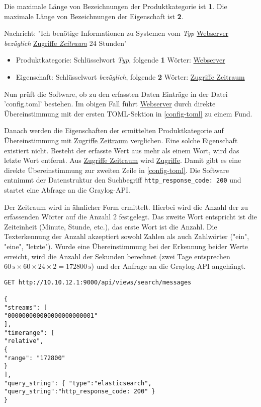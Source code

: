 Die maximale Länge von Bezeichnungen der Produktkategorie ist \textbf{1}. Die maximale Länge von Bezeichnungen der Eigenschaft ist \textbf{2}.

Nachricht: "Ich benötige Informationen zu Systemen vom \textit{Typ} \uline{Webserver} \textit{bezüglich} \uline{Zugriffe \textit{Zeitraum}} 24 Stunden"

\begin{itemize}
\item Produktkategorie: Schlüsselwort \textit{Typ}, folgende \textbf{1} Wörter: \uline{Webserver}
\item Eigenschaft: Schlüsselwort \textit{bezüglich}, folgende \textbf{2} Wörter: \uline{Zugriffe Zeitraum}
\end{itemize}

Nun prüft die Software, ob zu den erfassten Daten Einträge in der Datei 'config.toml' bestehen. Im obigen Fall führt \uline{Webserver} durch direkte Übereinstimmung mit der ersten TOML-Sektion in \autoref{config-toml} zu einem Fund. 

Danach werden die Eigenschaften der ermittelten Produktkategorie auf Übereinstimmung mit \uline{Zugriffe Zeitraum} verglichen. Eine solche Eigenschaft existiert nicht. Besteht der erfasste Wert aus mehr als einem Wort, wird das letzte Wort entfernt. Aus \uline{Zugriffe Zeitraum} wird \uline{Zugriffe}. Damit gibt es eine direkte Übereinstimmung zur zweiten Zeile in \autoref{config-toml}. Die Software entnimmt der Datenstruktur den Suchbegriff \lstinline{http_response_code: 200} und startet eine Abfrage an die Graylog-API.

Der Zeitraum wird in ähnlicher Form ermittelt. Hierbei wird die Anzahl der zu erfassenden Wörter auf die Anzahl 2 festgelegt. Das zweite Wort entspricht ist die Zeiteinheit (Minute, Stunde, etc.), das erste Wort ist die Anzahl. Die Texterkennung der Anzahl akzeptiert sowohl Zahlen als auch Zahlwörter ("ein", "eine", "letzte"). Wurde eine Übereinstimmung bei der Erkennung beider Werte erreicht, wird die Anzahl der Sekunden berechnet (zwei Tage entsprechen $60~\mathrm{s} \times 60 \times 24 \times 2 = 172800~\mathrm{s}$) und der Anfrage an die Graylog-API angehängt.

\begin{lstlisting}[caption={Anfrage der Software an Graylog mit den ermittelten Daten}, label=graylog-query, xleftmargin=6mm]
GET http://10.10.12.1:9000/api/views/search/messages

{
"streams": [
"000000000000000000000001"
],
"timerange": [
"relative",
{
"range": "172800"
}
],
"query_string": { "type":"elasticsearch", "query_string":"http_response_code: 200" }
}
\end{lstlisting}

